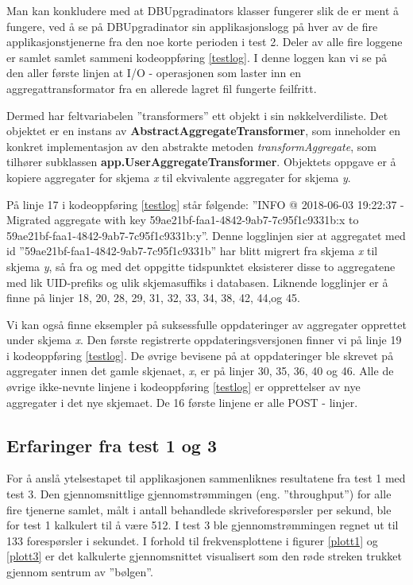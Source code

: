 Man kan konkludere med at DBUpgradinators klasser fungerer slik de er ment å fungere, ved å se på DBUpgradinator sin applikasjonslogg på hver av de fire applikasjonstjenerne fra den noe korte perioden i test 2. Deler av alle fire loggene er samlet samlet sammeni kodeoppføring \ref{testlog}. I denne loggen kan vi se på den aller første linjen at I/O - operasjonen som laster inn en aggregattransformator fra en allerede lagret fil fungerte feilfritt.

Dermed har feltvariabelen ''transformers'' ett objekt i sin nøkkelverdi\-liste. Det objektet er en instans av \textbf{AbstractAggregateTransformer}, som inneholder en konkret implementasjon av den abstrakte metoden \emph{transformAggregate}, som tilhører subklassen \textbf{app.}\textbf{\-UserAggregateTransformer}. Objektets oppgave er å kopiere aggregater for skjema \emph{x} til ekvivalente aggregater for skjema \emph{y}.

På linje 17 i kodeoppføring \ref{testlog} står følgende: ''INFO @ 2018-06-03 19:22:37 - Migrated aggregate with key 59ae21bf-faa1-4842-9ab7-7c95f1c9331b:x to 59ae21bf-faa1-4842-9ab7-7c95f1c9331b:y''. Denne logglinjen sier at aggregatet med id ''59ae21bf-faa1-4842-9ab7-7c95f1c9331b'' har blitt migrert fra skjema \emph{x} til skjema \emph{y}, så fra og med det oppgitte tidspunktet eksisterer disse to aggregatene med lik UID-prefiks og ulik skjemasuffiks i databasen. Liknende logglinjer er å finne på linjer 18, 20, 28, 29, 31, 32, 33, 34, 38, 42, 44,og 45.

Vi kan også finne eksempler på suksessfulle oppdateringer av aggregater opprettet under skjema \emph{x}. Den første registrerte oppdateringsversjonen finner vi på linje 19 i kodeoppføring \ref{testlog}. De øvrige bevisene på at oppdateringer ble skrevet på aggregater innen det gamle skjenaet, \emph{x}, er på linjer 30, 35, 36, 40 og 46. Alle de øvrige ikke-nevnte linjene i kodeoppføring \ref{testlog} er opprettelser av nye aggregater i det nye skjemaet. De 16 første linjene er alle POST - linjer.

\subsection{Erfaringer fra test 1 og 3}

For å anslå ytelsestapet til applikasjonen sammenliknes resultatene fra test 1 med test 3. Den gjennomsnittlige gjennomstrømmingen (eng. ''throughput'') for alle fire tjenerne samlet, målt i antall behandlede skriveforespørsler per sekund, ble for test 1 kalkulert til å være 512. I test 3 ble gjennomstrømmingen regnet ut til 133 forespørsler i sekundet. I forhold til frekvensplottene i figurer \ref{plott1} og \ref{plott3} er det kalkulerte gjennomsnittet visualisert som den røde streken trukket gjennom sentrum av ''bølgen''.

